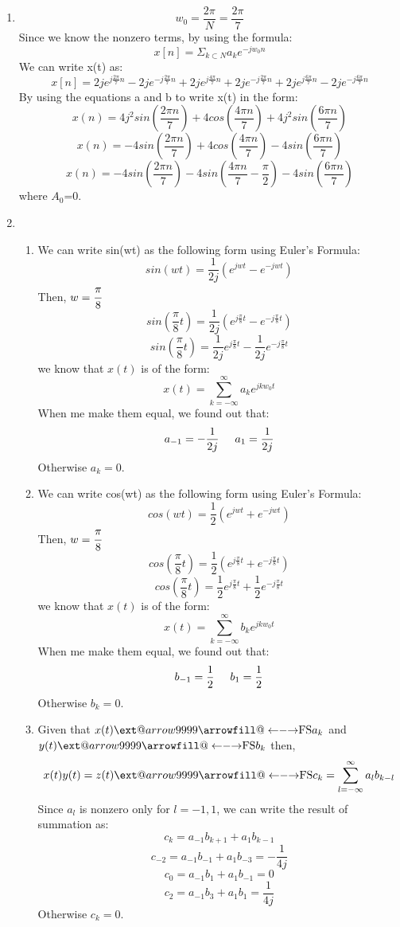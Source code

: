 \documentclass[10pt,a4paper, margin=1in]{article}
\makeatletter
\newcommand\xleftrightarrow[2][]{%
  \ext@arrow 9999{\longleftrightarrowfill@}{#1}{#2}}
\newcommand\longleftrightarrowfill@{%
  \arrowfill@\leftarrow\relbar\rightarrow}
\makeatother
\begin{document}
\begin{enumerate}
\item %
    \[w_0=\frac{2\pi}{N}=\frac{2\pi}{7}\]
    Since we know the nonzero terms, by using the formula:
    \[x[n]=\Sigma_{k\subset N}a_ke^{-j{w_0}n}\]
    We can write x(t) as:
    \[x[n]=2je^{j\frac{2\pi}{7}n}-2je^{-j\frac{2\pi}{7}n}+2je^{j\frac{4\pi}{7}n}+2je^{-j\frac{2\pi}{7}n}+2je^{j\frac{6\pi}{7}n}-2je^{-j\frac{6\pi}{7}n}\]
    By using the equations a and b to write x(t) in the form:
    \[x(n)=4{j^2}sin(\frac{2\pi n}{7})+4cos(\frac{4\pi n}{7})+4{j^2}sin(\frac{6\pi n}{7})\]
    \[x(n)=-4sin(\frac{2\pi n}{7})+4cos(\frac{4\pi n}{7})-4sin(\frac{6\pi n}{7})\]
    \[x(n)=-4sin(\frac{2\pi n}{7})-4sin(\frac{4\pi n}{7}-\frac{\pi}{2})-4sin(\frac{6\pi n}{7})\]
    where $A_0$=0. 
\item %
    \begin{enumerate}
    \item We can write sin(wt) as the following form using Euler's Formula:
    \[sin(wt) = \frac{1}{2j}(e^{jwt} - e^{-jwt})\]
    Then, $w=\cfrac{\pi}{8}$
    \[sin(\frac{\pi}{8}t) = \frac{1}{2j}(e^{j\frac{\pi}{8}t} - e^{-j\frac{\pi}{8}t})\]
    \[sin(\frac{\pi}{8}t) = \frac{1}{2j}e^{j\frac{\pi}{8}t} - \frac{1}{2j}e^{-j\frac{\pi}{8}t}\]
    we know that $x(t)$ is of the form:
    \[x(t) = \sum_{k=-\infty}^{\infty}a_k e^{jkw_0t}\]
    When me make them equal, we found out that:
    \[a_{-1} = -\frac{1}{2j} \hspace{5mm} a_1 = \frac{1}{2j}\]
    Otherwise $a_k = 0$.\\
    \item We can write cos(wt) as the following form using Euler's Formula:
    \[cos(wt) = \frac{1}{2}(e^{jwt} + e^{-jwt})\]
    Then, $w=\cfrac{\pi}{8}$
    \[cos(\frac{\pi}{8}t) = \frac{1}{2}(e^{j\frac{\pi}{8}t} + e^{-j\frac{\pi}{8}t})\]
    \[cos(\frac{\pi}{8}t) = \frac{1}{2}e^{j\frac{\pi}{8}t} + \frac{1}{2}e^{-j\frac{\pi}{8}t}\]
    we know that $x(t)$ is of the form:
    \[x(t) = \sum_{k=-\infty}^{\infty}b_k e^{jkw_0t}\]
    When me make them equal, we found out that:
    \[b_{-1} = \frac{1}{2} \hspace{5mm} b_1 = \frac{1}{2}\]
    Otherwise $b_k = 0$.\\
    \item Given that $x(t) \xleftrightarrow{\text{FS}} a_k$ and $y(t) \xleftrightarrow{\text{FS}} b_k$ then,
    \[x(t)y(t) = z(t) \xleftrightarrow{\text{FS}} c_k = \sum_{l=-\infty}^{\infty} a_l b_{k-l}\]
    Since $a_l$ is nonzero only for $l=-1,1$, we can write the result of summation as:
    \[c_k = a_{-1}b_{k+1} + a_1b_{k-1}\]
    \[c_{-2} = a_{-1}b_{-1} + a_1b_{-3} = -\frac{1}{4j}\]
    \[c_{0} = a_{-1}b_1 + a_{1}b_{-1} = 0\]
    \[c_2 = a_{-1}b_3 + a_1b_1 = \frac{1}{4j}\]
    Otherwise $c_k = 0$.
    \end{enumerate}


\end{enumerate}
\end{document}
